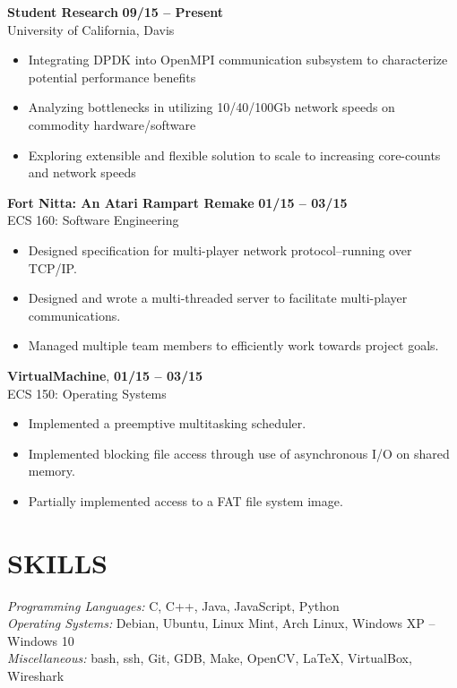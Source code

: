 \documentclass[10pt, letterpaper]{res}
\begin{document}
\begin{resume}
    {\bf Student Research} \hfill {\bf 09/15 -- Present} \\
    University of California, Davis
    \begin{itemize}[noitemsep]
		\item Integrating DPDK into OpenMPI communication subsystem to characterize potential performance benefits
        \item Analyzing bottlenecks in utilizing 10/40/100Gb network speeds on commodity hardware/software
        \item Exploring extensible and flexible solution to scale to increasing core-counts and network speeds
    \end{itemize}
	
    {\bf Fort Nitta: An Atari Rampart Remake} \hfill {\bf 01/15 -- 03/15} \\
    ECS 160: Software Engineering
    \begin{itemize}[noitemsep]
        \item Designed specification for multi-player network protocol--running over TCP/IP.
        \item Designed and wrote a multi-threaded server to facilitate multi-player communications.
        \item Managed multiple team members to efficiently work towards project goals.
    \end{itemize}

    {\bf VirtualMachine}, \hfill  {\bf 01/15 -- 03/15} \\
    ECS 150: Operating Systems
    \begin{itemize}[noitemsep]
        \item Implemented a preemptive multitasking scheduler.
        \item Implemented blocking file access through use of asynchronous I/O on shared memory.
        \item Partially implemented access to a FAT file system image.
    \end{itemize}


\section{SKILLS}
    {\sl Programming Languages:}  C, C++, Java, JavaScript, Python \\
    {\sl Operating Systems:} Debian, Ubuntu, Linux Mint, Arch Linux, Windows XP -- Windows 10 \\
    {\sl Miscellaneous: } bash, ssh, Git, GDB, Make, OpenCV, LaTeX, VirtualBox, Wireshark


\end{resume}
\end{document}
